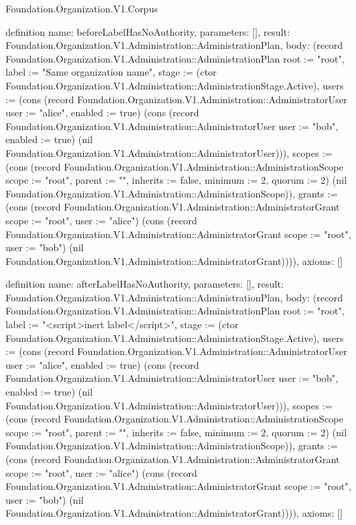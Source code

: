 \begin{lexlean}{Foundation.Organization.V1.Corpus}
\begin{semanticmodule}
definition{
  name: beforeLabelHasNoAuthority,
  parameters: [],
  result: Foundation.Organization.V1.Administration::AdministrationPlan,
  body: (record Foundation.Organization.V1.Administration::AdministrationPlan {root := "root", label := "Same organization name", stage := (ctor Foundation.Organization.V1.Administration::AdministrationStage.Active), users := (cons (record Foundation.Organization.V1.Administration::AdministratorUser {user := "alice", enabled := true}) (cons (record Foundation.Organization.V1.Administration::AdministratorUser {user := "bob", enabled := true}) (nil Foundation.Organization.V1.Administration::AdministratorUser))), scopes := (cons (record Foundation.Organization.V1.Administration::AdministrationScope {scope := "root", parent := "", inherits := false, minimum := 2, quorum := 2}) (nil Foundation.Organization.V1.Administration::AdministrationScope)), grants := (cons (record Foundation.Organization.V1.Administration::AdministratorGrant {scope := "root", user := "alice"}) (cons (record Foundation.Organization.V1.Administration::AdministratorGrant {scope := "root", user := "bob"}) (nil Foundation.Organization.V1.Administration::AdministratorGrant)))}),
  axioms: []
}

definition{
  name: afterLabelHasNoAuthority,
  parameters: [],
  result: Foundation.Organization.V1.Administration::AdministrationPlan,
  body: (record Foundation.Organization.V1.Administration::AdministrationPlan {root := "root", label := "<script>inert label</script>", stage := (ctor Foundation.Organization.V1.Administration::AdministrationStage.Active), users := (cons (record Foundation.Organization.V1.Administration::AdministratorUser {user := "alice", enabled := true}) (cons (record Foundation.Organization.V1.Administration::AdministratorUser {user := "bob", enabled := true}) (nil Foundation.Organization.V1.Administration::AdministratorUser))), scopes := (cons (record Foundation.Organization.V1.Administration::AdministrationScope {scope := "root", parent := "", inherits := false, minimum := 2, quorum := 2}) (nil Foundation.Organization.V1.Administration::AdministrationScope)), grants := (cons (record Foundation.Organization.V1.Administration::AdministratorGrant {scope := "root", user := "alice"}) (cons (record Foundation.Organization.V1.Administration::AdministratorGrant {scope := "root", user := "bob"}) (nil Foundation.Organization.V1.Administration::AdministratorGrant)))}),
  axioms: []
}


\end{semanticmodule}
\end{lexlean}
